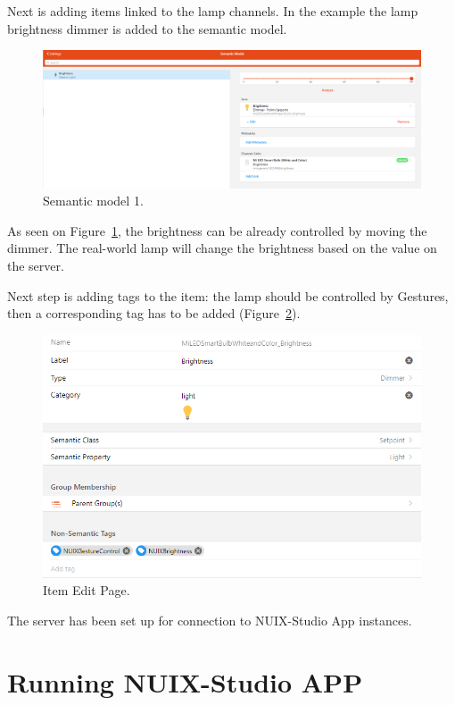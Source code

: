Next is adding items linked to the lamp channels. In the example the lamp brightness dimmer is added to the semantic model.

\begin{figure}
  \centering
  \includegraphics[width=0.9\linewidth]{figures/SemanticModelOne.png}
  \caption{Semantic model 1.}
  \label{fig:SemanticModelOne-figure}
\end{figure}

As seen on Figure~\ref{fig:SemanticModelOne-figure}, the brightness can be already controlled by moving the dimmer. The real-world lamp will change the brightness based on the value on the server.

Next step is adding tags to the item: the lamp should be controlled by Gestures, then a corresponding tag has to be added (Figure~\ref{fig:ItemEditPage-figure}).

\begin{figure}
  \centering
  \includegraphics[width=0.9\linewidth]{figures/ItemEditPage.png}
  \caption{Item Edit Page.}
  \label{fig:ItemEditPage-figure}
\end{figure}

The server has been set up for connection to NUIX-Studio App instances.

\section{Running NUIX-Studio APP}


